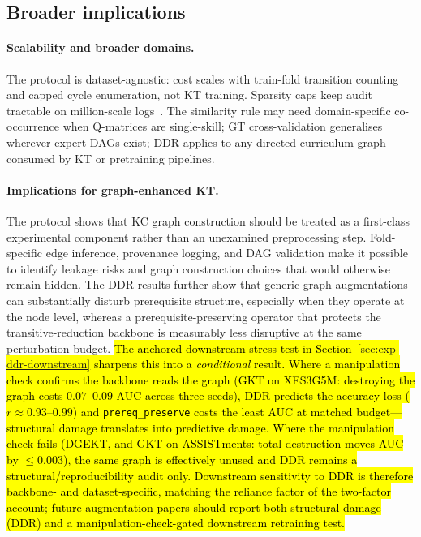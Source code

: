 \documentclass[pdflatex,sn-mathphys-num]{sn-jnl}
\newcommand{\DDR}{\textsc{DDR}}
\newcommand{\rev}[1]{\hl{#1}}
\newcommand{\rev}[1]{#1}
\begin{document}
\subsection{Broader implications}
\label{sec:disc-implications}

\paragraph{Scalability and broader domains.}
The protocol is dataset-agnostic: cost scales with train-fold transition
counting and capped cycle enumeration, not KT training. Sparsity caps keep
audit tractable on million-scale logs~\cite{choi2020ednet}. The similarity
rule may need domain-specific co-occurrence when Q-matrices are single-skill;
GT cross-validation generalises wherever expert DAGs exist; \DDR{} applies to
any directed curriculum graph consumed by KT or pretraining pipelines.

\paragraph{Implications for graph-enhanced KT.}
The protocol shows that KC graph construction should be treated as a
first-class experimental component rather than an unexamined
preprocessing step. Fold-specific edge inference, provenance logging,
and DAG validation make it possible to identify leakage risks and graph
construction choices that would otherwise remain hidden. The \DDR{}
results further show that generic graph augmentations can substantially
disturb prerequisite structure, especially when they operate at the node
level, whereas a prerequisite-preserving operator that protects the
transitive-reduction backbone is measurably less disruptive at the same
perturbation budget. \rev{The anchored downstream stress test in
\mbox{Section~\ref{sec:exp-ddr-downstream}} sharpens this into a \emph{conditional}
result. Where a manipulation check confirms the backbone reads the graph
(GKT on XES3G5M: destroying the graph costs \mbox{$0.07$}--\mbox{$0.09$} AUC across three seeds), \DDR{}
predicts the accuracy loss (\mbox{$r{\approx}0.93$--$0.99$}) and \mbox{\texttt{prereq\_preserve}} costs the
least AUC at matched budget---structural damage translates into predictive
damage. Where the manipulation check fails (DGEKT, and GKT on ASSISTments:
total destruction moves AUC by \mbox{${\le}0.003$}), the same graph is effectively
unused and \DDR{} remains a structural/reproducibility audit only. Downstream
sensitivity to \DDR{} is therefore backbone- and dataset-specific, matching the
reliance factor of the two-factor account; future augmentation papers should
report both structural damage (\DDR{}) and a manipulation-check-gated
downstream retraining test.}
\end{document}
